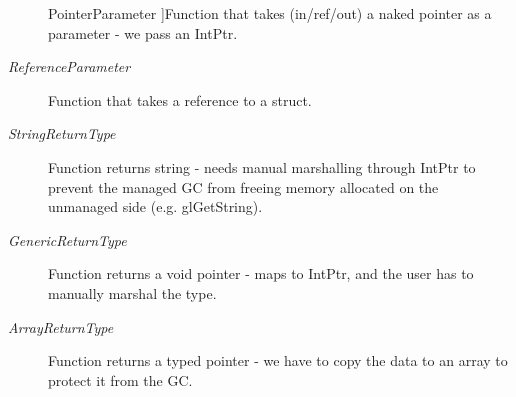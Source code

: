 \begin{Desc}
\begin{description}
{\hypertarget{namespace_bind_a84806c2a8584c294f366e3b50609f0bd}{
PointerParameter}
\label{namespace_bind_a84806c2a8584c294f366e3b50609f0bd}
}]Function that takes (in/ref/out) a naked pointer as a parameter -\/ we pass an IntPtr. \item[{\em 
\hypertarget{namespace_bind_a84806c2a8584c294f366e3b50609f0bd}{
ReferenceParameter}
\label{namespace_bind_a84806c2a8584c294f366e3b50609f0bd}
}]Function that takes a reference to a struct. \item[{\em 
\hypertarget{namespace_bind_a84806c2a8584c294f366e3b50609f0bd}{
StringReturnType}
\label{namespace_bind_a84806c2a8584c294f366e3b50609f0bd}
}]Function returns string -\/ needs manual marshalling through IntPtr to prevent the managed GC from freeing memory allocated on the unmanaged side (e.g. glGetString). \item[{\em 
\hypertarget{namespace_bind_a84806c2a8584c294f366e3b50609f0bd}{
GenericReturnType}
\label{namespace_bind_a84806c2a8584c294f366e3b50609f0bd}
}]Function returns a void pointer -\/ maps to IntPtr, and the user has to manually marshal the type. \item[{\em 
\hypertarget{namespace_bind_a84806c2a8584c294f366e3b50609f0bd}{
ArrayReturnType}
\label{namespace_bind_a84806c2a8584c294f366e3b50609f0bd}
}]Function returns a typed pointer -\/ we have to copy the data to an array to protect it from the GC. \end{description}
\end{Desc}

